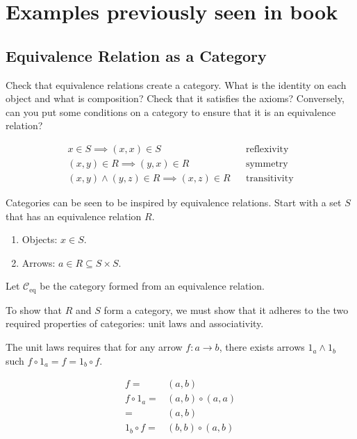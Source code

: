\section{Examples previously seen in book}
\subsection{Equivalence Relation as a Category}

\begin{ttta} Check that equivalence relations create a category. What is the
    identity on each object and what is composition? Check that it satisfies the
    axioms? Conversely, can you put some conditions on a category to ensure that
    it is an equivalence relation?
\end{ttta}
\begin{proofitem}
    \item
\begin{align}
    x \in S \implies (x, x) \in S &&\text{reflexivity}\\
    (x,y) \in R \implies (y, x) \in R &&\text{symmetry}\\
    (x,y) \land (y, z) \in R \implies (x, z) \in R &&\text{transitivity}
\end{align}
\item
Categories can be seen to be inspired by equivalence relations. Start with a set
$S$ that has an equivalence relation $R$.
\begin{enumerate}
    \item Objects: $x\in S$.
    \item Arrows: $a\in R\subseteq S\times S$.
\end{enumerate}
\item Let $\mathcal{C}_{\text{eq}}$ be the category formed from an equivalence
    relation.
\item To show that $R$ and $S$ form a category, we must show that it adheres to
    the two required properties of categories: unit laws and associativity.
\item The unit laws requires that for any arrow $f:a \rightarrow b$, there
    exists arrows $1_a \land 1_b$ such $f\circ 1_a = f = 1_b \circ f$.
\begin{figure}[H]
\begin{align*}
    f=&(a, b)\\
    f\circ 1_a=& (a, b)\circ(a, a)\\
    =&(a, b)\\
    1_b\circ f=& (b, b)\circ(a, b)\\

\end{align*}
\end{figure}
\end{proofitem}

